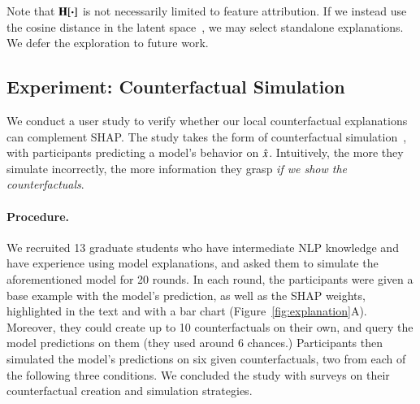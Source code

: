 Note that $\operatorname*{\mathbf{H}}[\boldsymbol{\cdot}]$ is not necessarily limited to feature attribution.
If we instead use the cosine distance in the latent space~\cite{reimers-2019-sentence-bert}, we may select standalone explanations.
We defer the exploration to future work.


\subsection{Experiment: Counterfactual Simulation}
\label{subsec:exp_user_study}

We conduct a user study to verify whether our local counterfactual explanations can complement SHAP.
The study takes the form of counterfactual simulation~\cite{hase2020evaluating}, with participants predicting a model's behavior on $\hat{x}$.
Intuitively, the more they simulate incorrectly, the more information they grasp \emph{if we show the counterfactuals}.

\paragraph{Procedure.}
We recruited 13 graduate students who have intermediate NLP knowledge and have experience using model explanations, and asked them to simulate the aforementioned \qqp model for 20 rounds.
In each round, the participants were given a base example with the model's prediction, as well as the SHAP weights, highlighted in the text and with a bar chart (Figure~\ref{fig:explanation}A).
Moreover, they could create up to 10 counterfactuals on their own, and query the model predictions on them (they used around 6 chances.)
Participants then simulated the model's predictions on six given counterfactuals, two from each of the following three conditions.
We concluded the study with surveys on their counterfactual creation and simulation strategies.



